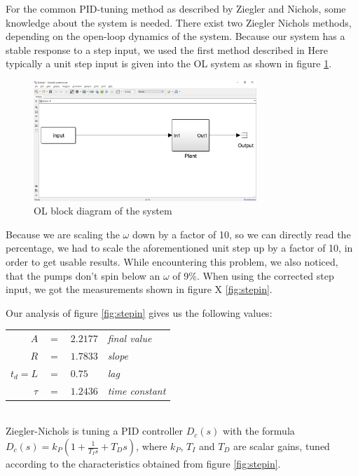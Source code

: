 For the common PID-tuning method as described by Ziegler and Nichols,
some knowledge about the system is needed.
There exist two Ziegler Nichols methods,
depending on the open-loop dynamics of the system.
Because our system has a stable response to a step input, we used the first method described in 
Here typically a unit step input is given into the OL system as shown in figure \ref{fig:OL}.

\begin{figure}[H]
    \centering
    \includegraphics[width=0.75\textwidth]{figures/04ExperimentsAndLabWork/OLblock.png}
    \caption{OL block diagram of the system}
\label{fig:OL}
\end{figure}

Because we are scaling the $\omega$ down by a factor of 10, so we can directly read the percentage,
we had to scale the aforementioned unit step up by a factor of 10,
in order to get usable results.
While encountering this problem, we also noticed, that the pumps don't spin below an $\omega$ of 9\%.
When using the corrected step input, we got the measurements shown in figure X \ref{fig:stepin}.

Our analysis of figure \ref{fig:stepin} gives us the following values:
\\
\begin{tabular}{r c l l}
	$A$ 	& $=$ & $2.2177$ 	& \footnotesize{\textit{final value}}\\
	$R$ 	& $=$ & $1.7833$ 	& \footnotesize{\textit{slope}}\\
	$t_d=L$	& $=$ & $0.75$ 		& \footnotesize{\textit{lag}}\\
	$\tau$ 	& $=$ & $1.2436$ 	& \footnotesize{\textit{time constant}}
\end{tabular}
\\
Ziegler-Nichols is tuning a PID controller $D_c(s)$ with the formula\\
$D_c(s)=k_P(1+ \frac{1}{T_Is}+T_Ds)$,
where $k_P$, $T_I$ and $T_D$ are scalar gains,
tuned according to the characteristics obtained from figure \ref{fig:stepin}.


